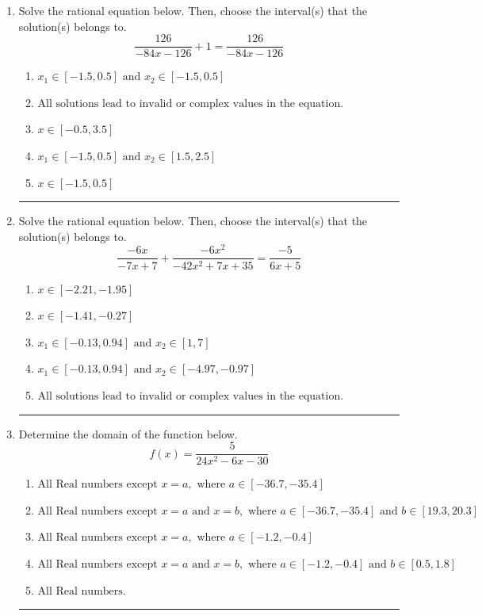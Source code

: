 \documentclass[14pt]{extbook}
\newcommand{\litem}[1]{\item#1\hspace*{-1cm}\rule{\textwidth}{0.4pt}}
\begin{document}
\begin{enumerate}
{\begin{enumerate}[label=\Alph*.]
\end{enumerate} }
\litem{
Solve the rational equation below. Then, choose the interval(s) that the solution(s) belongs to.\[ \frac{126}{-84x -126} + 1 = \frac{126}{-84x -126} \]\begin{enumerate}[label=\Alph*.]
\item \( x_1 \in [-1.5, 0.5] \text{ and } x_2 \in [-1.5,0.5] \)
\item \( \text{All solutions lead to invalid or complex values in the equation.} \)
\item \( x \in [-0.5,3.5] \)
\item \( x_1 \in [-1.5, 0.5] \text{ and } x_2 \in [1.5,2.5] \)
\item \( x \in [-1.5,0.5] \)

\end{enumerate} }
\litem{
Solve the rational equation below. Then, choose the interval(s) that the solution(s) belongs to.\[ \frac{-6x}{-7x + 7} + \frac{-6x^{2}}{-42x^{2} +7 x + 35} = \frac{-5}{6x + 5} \]\begin{enumerate}[label=\Alph*.]
\item \( x \in [-2.21,-1.95] \)
\item \( x \in [-1.41,-0.27] \)
\item \( x_1 \in [-0.13, 0.94] \text{ and } x_2 \in [1,7] \)
\item \( x_1 \in [-0.13, 0.94] \text{ and } x_2 \in [-4.97,-0.97] \)
\item \( \text{All solutions lead to invalid or complex values in the equation.} \)

\end{enumerate} }
\litem{
Determine the domain of the function below.\[ f(x) = \frac{5}{24x^{2} -6 x -30} \]\begin{enumerate}[label=\Alph*.]
\item \( \text{All Real numbers except } x = a, \text{ where } a \in [-36.7, -35.4] \)
\item \( \text{All Real numbers except } x = a \text{ and } x = b, \text{ where } a \in [-36.7, -35.4] \text{ and } b \in [19.3, 20.3] \)
\item \( \text{All Real numbers except } x = a, \text{ where } a \in [-1.2, -0.4] \)
\item \( \text{All Real numbers except } x = a \text{ and } x = b, \text{ where } a \in [-1.2, -0.4] \text{ and } b \in [0.5, 1.8] \)
\item \( \text{All Real numbers.} \)

\end{enumerate} }
\end{enumerate}
\end{document}
